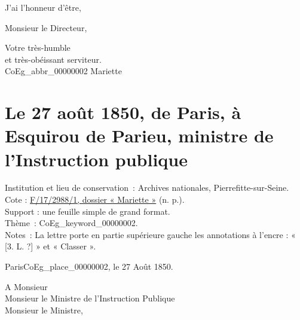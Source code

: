 \documentclass{book}
\begin{document}
\par J’ai l’honneur d’être,
\begin{center} Monsieur le Directeur,\end{center}
\begin{center} \hspace{5cm}Votre très-humble\\
\hspace{5cm}et très-obéissant serviteur.\\
\hspace{5cm} \gls{CoEg_abbr_00000002} Mariette\\
 \end{center}

\hypertarget{CoEg_Mariette_1850-08-27}{}

\section*{Le 27 août 1850, de Paris, à Esquirou de Parieu, ministre de l’Instruction publique}
 \label{labCoEg_Mariette_1850-08-27}
{\footnotesize
\noindent Institution et lieu de conservation~: Archives nationales, Pierrefitte-sur-Seine.\\
Cote : \hyperlink{CoEg_Mariette_ms_002}{F/17/2988/1, dossier « Mariette »} (n. p.).\\
Support : une feuille simple de grand format.\\
Thème~: \gls{CoEg_keyword_00000002}.\\
Notes~: La lettre porte en partie supérieure gauche les annotations à l’encre  : « [3. L. ?] » et « Classer ».}
 
\begin{flushright}Paris\gls{CoEg_place_00000002}, le 27 Août 1850.\end{flushright}

\noindent A Monsieur\\
\indent \hspace{1cm} Monsieur le Ministre de l’Instruction Publique\\

\hspace{1cm} Monsieur le Ministre,\\
\end{document}
